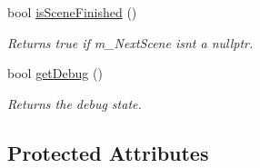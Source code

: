\begin{DoxyCompactItemize}
bool \hyperlink{class_scene_a67993233347f2f6ab2765598b627d9aa}{is\+Scene\+Finished} ()
\begin{DoxyCompactList}\small\item\em Returns true if m\+\_\+\+Next\+Scene isnt a nullptr. \end{DoxyCompactList}\item 
\mbox{\label{class_scene_afb6e039ff2c88295876cf83e599644f4}} 
bool \hyperlink{class_scene_afb6e039ff2c88295876cf83e599644f4}{get\+Debug} ()
\begin{DoxyCompactList}\small\item\em Returns the debug state. \end{DoxyCompactList}\end{DoxyCompactItemize}
\subsection*{Protected Attributes}

